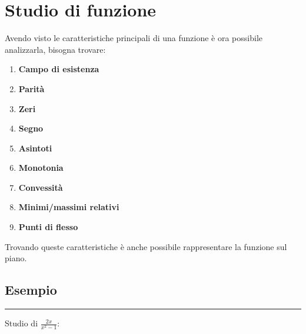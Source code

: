 \documentclass{article}
\begin{document}
\newpage

\section{Studio di funzione}

Avendo visto le caratteristiche principali di una funzione è ora possibile analizzarla, bisogna trovare:
\begin{enumerate}
    \item \textbf{Campo di esistenza}
    \item \textbf{Parità}
    \item \textbf{Zeri}
    \item \textbf{Segno}
    \item \textbf{Asintoti}
    \item \textbf{Monotonia}
    \item \textbf{Convessità}
    \item \textbf{Minimi/massimi relativi}
    \item \textbf{Punti di flesso}\newline
\end{enumerate}

\noindent Trovando queste caratteristiche è anche possibile rappresentare la funzione sul piano.\newline

\subsection{Esempio}

\noindent\rule{\textwidth}{0.5pt}\newline

\noindent Studio di $\frac{2x}{x^2-1}$:
\end{document}
